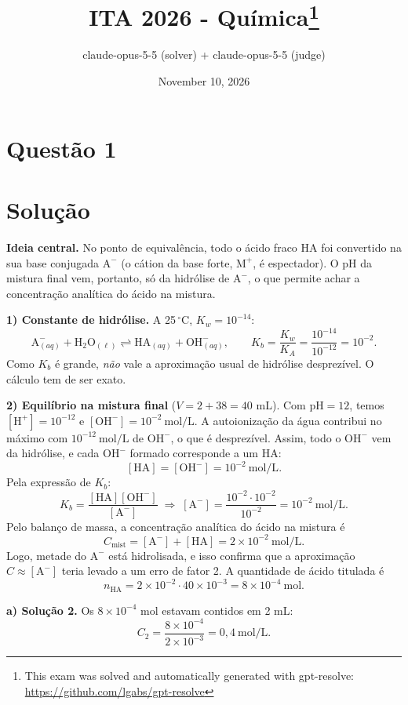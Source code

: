 \documentclass{article}%
\title{ITA 2026 - Química\thanks{This exam was solved and automatically generated with gpt-resolve: \url{https://github.com/lgabs/gpt-resolve}}}%
\author{claude{-}opus{-}5{-}5 (solver) + claude{-}opus{-}5{-}5 (judge)}%
\date{November 10, 2026}%
\begin{document}
%
\normalsize%
\maketitle%
\section*{Questão 1}

\section*{Solução}

\textbf{Ideia central.} No ponto de equivalência, todo o ácido fraco HA foi convertido na sua base conjugada $\text{A}^-$ (o cátion da base forte, $\text{M}^+$, é espectador). O pH da mistura final vem, portanto, só da hidrólise de $\text{A}^-$, o que permite achar a concentração analítica do ácido na mistura.

\textbf{1) Constante de hidrólise.} A 25\,$^\circ$C, $K_w = 10^{-14}$:
\[
\text{A}^-_{(aq)} + \text{H}_2\text{O}_{(\ell)} \rightleftharpoons \text{HA}_{(aq)} + \text{OH}^-_{(aq)},
\qquad K_b = \frac{K_w}{K_A} = \frac{10^{-14}}{10^{-12}} = 10^{-2}.
\]
Como $K_b$ é grande, \emph{não} vale a aproximação usual de hidrólise desprezível. O cálculo tem de ser exato.

\textbf{2) Equilíbrio na mistura final} ($V = 2 + 38 = 40$ mL). Com $\text{pH} = 12$, temos $[\text{H}^+] = 10^{-12}$ e $[\text{OH}^-] = 10^{-2}\ \text{mol/L}$. A autoionização da água contribui no máximo com $10^{-12}\ \text{mol/L}$ de $\text{OH}^-$, o que é desprezível. Assim, todo o $\text{OH}^-$ vem da hidrólise, e cada $\text{OH}^-$ formado corresponde a um HA:
\[
[\text{HA}] = [\text{OH}^-] = 10^{-2}\ \text{mol/L}.
\]
Pela expressão de $K_b$:
\[
K_b = \frac{[\text{HA}][\text{OH}^-]}{[\text{A}^-]}
\;\Rightarrow\;
[\text{A}^-] = \frac{10^{-2}\cdot 10^{-2}}{10^{-2}} = 10^{-2}\ \text{mol/L}.
\]
Pelo balanço de massa, a concentração analítica do ácido na mistura é
\[
C_{\text{mist}} = [\text{A}^-] + [\text{HA}] = 2\times 10^{-2}\ \text{mol/L}.
\]
Logo, metade do $\text{A}^-$ está hidrolisada, e isso confirma que a aproximação $C \approx [\text{A}^-]$ teria levado a um erro de fator 2. A quantidade de ácido titulada é
\[
n_{\text{HA}} = 2\times 10^{-2}\cdot 40\times 10^{-3} = 8\times 10^{-4}\ \text{mol}.
\]

\textbf{a) Solução 2.} Os $8\times10^{-4}$ mol estavam contidos em 2 mL:
\[
C_2 = \frac{8\times 10^{-4}}{2\times 10^{-3}} = 0{,}4\ \text{mol/L}.
\]
\end{document}
